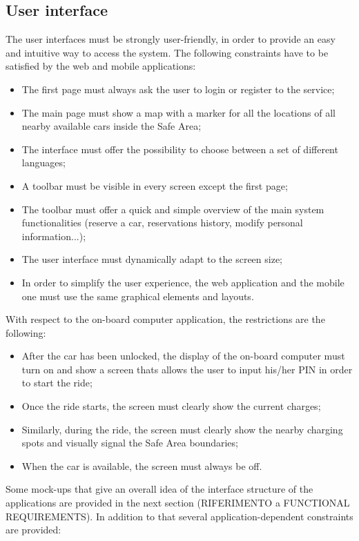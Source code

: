 \subsection{User interface}
The user interfaces must be strongly user-friendly, in order to provide an easy and intuitive way to access the system. The following constraints have to be satisfied by the web and mobile applications:
\begin{itemize}
\item The first page must always ask the user to login or register to the service;
\item The main page must show a map with a marker for all the locations of all nearby available cars inside the Safe Area;
\item The interface must offer the possibility to choose between a set of different languages;
\item A toolbar must be visible in every screen except the first page;
\item The toolbar must offer a quick and simple overview of the main system functionalities (reserve a car, reservations history, modify personal information...);
\item The user interface must dynamically adapt to the screen size;
\item In order to simplify the user experience, the web application and the mobile one must use the same graphical elements and layouts.
\end{itemize}
With respect to the on-board computer application, the restrictions are the following:
\begin{itemize}
\item After the car has been unlocked, the display of the on-board computer must turn on and show a screen thats allows the user to input his/her PIN in order to start the ride;
\item Once the ride starts, the screen must clearly show the current charges;
\item Similarly, during the ride, the screen must clearly show the nearby charging spots and visually signal the Safe Area boundaries;
\item When the car is available, the screen must always be off.
\end{itemize}
Some mock-ups that give an overall idea of the interface structure of the applications are provided in the next section (RIFERIMENTO a FUNCTIONAL REQUIREMENTS).
In addition to that several application-dependent constraints are provided:
